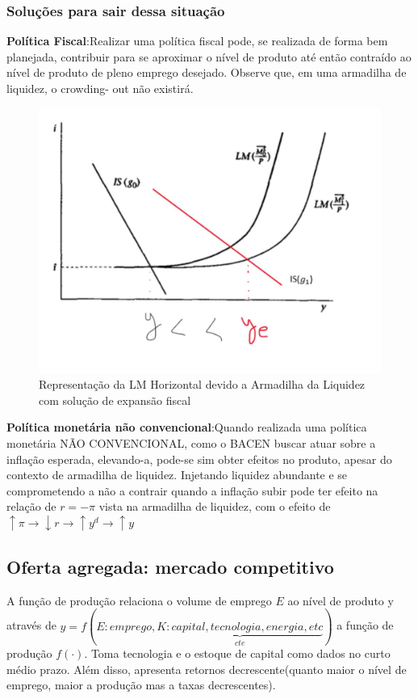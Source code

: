 \documentclass[a4paper,12pt]{article}[abntex2]
\begin{document}
\subsubsection{\textbf{Soluções para sair dessa situação}}
\textbf{Política Fiscal}:Realizar uma política fiscal pode, se realizada de forma bem planejada, contribuir para se aproximar o nível de produto até então contraído ao nível de produto de pleno emprego desejado. Observe que, em uma armadilha de liquidez, o crowding- out não existirá. 
\begin{figure}[H]
    \centering
    \caption{Representação da LM Horizontal devido a Armadilha da Liquidez com solução de expansão fiscal}
    \includegraphics[width=0.7\linewidth]{Imagens/a4i6.png}
\end{figure}

\textbf{Política monetária não convencional}:Quando realizada uma política monetária NÃO CONVENCIONAL, como o BACEN buscar atuar sobre a inflação esperada, elevando-a, pode-se sim obter efeitos no produto, apesar do contexto de armadilha de liquidez. Injetando liquidez abundante e se comprometendo a não a contrair quando a inflação subir pode ter efeito na relação de $r=-\pi$ vista na armadilha de liquidez, com o efeito de $\uparrow \pi \rightarrow \downarrow r \rightarrow \uparrow y^d \rightarrow \uparrow y$

\subsection{\textbf{Oferta agregada: mercado competitivo}}
A função de produção relaciona o volume de emprego $E$ ao nível de produto y através de \(y=f(E:emprego,\underbrace{K:capital, tecnologia, energia,etc}_{cte})\) a função de produção \(f(\cdot)\). Toma tecnologia e o estoque de capital como dados no curto médio prazo. Além disso, apresenta retornos decrescente(quanto maior o nível de emprego, maior a produção mas a taxas decrescentes).
\end{document}
